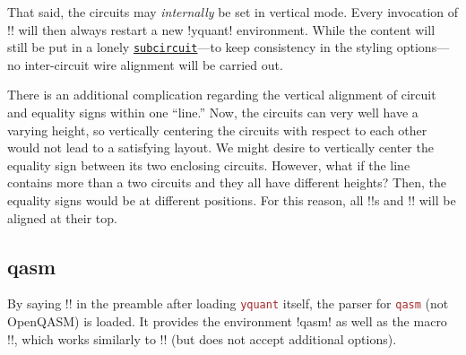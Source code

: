 \documentclass{scrartcl}
\def\pkg#1{\textcolor{brown}{\texttt{#1}}}
\def\gate#1{\hyperref[gate:#1]{\texttt{#1}}}
\def\Yquant{\pkg{yquant}}
\begin{document}
            That said, the circuits may \emph{internally} be set in vertical mode.
            Every invocation of \tex!\circuit! will then always restart a new \tex!yquant! environment.
            While the content will still be put in a lonely \gate{subcircuit}---to keep consistency in the styling options---no inter\hyp circuit wire alignment will be carried out.

            There is an additional complication regarding the vertical alignment of circuit and equality signs within one ``line.''
            Now, the circuits can very well have a varying height, so vertically centering the circuits with respect to each other would not lead to a satisfying layout.
            We might desire to vertically center the equality sign between its two enclosing circuits.
            However, what if the line contains more than a two circuits and they all have different heights?
            Then, the equality signs would be at different positions.
            For this reason, all \tex!\circuit!s and \tex!\equals! will be aligned at their top.

      \subsection{qasm}\label{sec:foreign:qasm}
         By saying \tex!! in the preamble after loading \Yquant{} itself, the parser for \pkg{qasm} (not OpenQASM) is loaded.
         It provides the environment \tex!qasm! as well as the macro \tex!\qasmimport!, which works similarly to \tex!\yquantimport! (but does not accept additional options).
\end{document}
